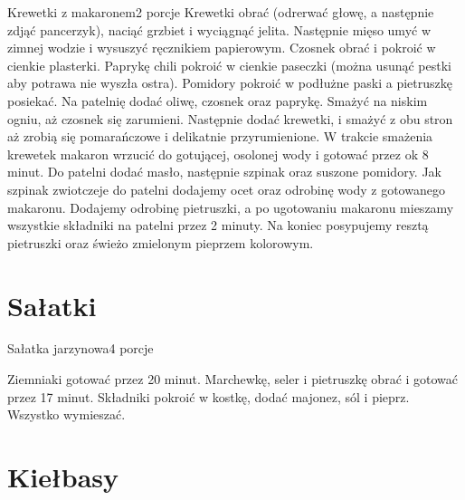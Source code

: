 \documentclass[a4paper,12pt]{article}
\begin{document}
\begin{recipe}{Krewetki z makaronem}{2 porcje}{}
Krewetki obrać (odrerwać głowę, a następnie zdjąć pancerzyk), naciąć grzbiet i wyciągnąć jelita. Następnie mięso umyć w zimnej wodzie i wysuszyć ręcznikiem papierowym.
Czosnek obrać i pokroić w cienkie plasterki. Paprykę chili pokroić w cienkie paseczki (można usunąć pestki aby potrawa nie wyszła ostra).
Pomidory pokroić w podłużne paski a pietruszkę posiekać.
Na patelnię dodać oliwę, czosnek oraz paprykę. Smażyć na niskim ogniu, aż czosnek się zarumieni.
Następnie dodać krewetki, i smażyć z obu stron aż zrobią się pomarańczowe i delikatnie przyrumienione.
\freeform%
W trakcie smażenia krewetek makaron wrzucić do gotującej, osolonej wody i gotować przez ok 8 minut. Do patelni dodać masło, następnie szpinak oraz suszone pomidory. Jak szpinak zwiotczeje do patelni dodajemy ocet oraz odrobinę wody z gotowanego makaronu. Dodajemy odrobinę pietruszki, a po ugotowaniu makaronu mieszamy wszystkie składniki na patelni przez 2 minuty. Na koniec posypujemy resztą pietruszki oraz świeżo zmielonym pieprzem kolorowym.

\end{recipe}

\newpage
\section{Sałatki}

\begin{recipe}{Sałatka jarzynowa}{4 porcje}{}

Ziemniaki gotować przez 20 minut. Marchewkę, seler i pietruszkę obrać i gotować przez 17 minut.
Składniki pokroić w kostkę, dodać majonez, sól i pieprz. Wszystko wymieszać.

\end{recipe}

\newpage

\newpage%
\section{Kiełbasy}
\end{document}
